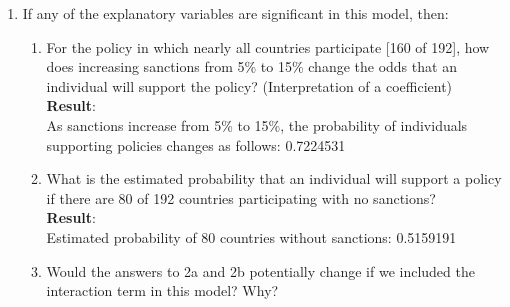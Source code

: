 \documentclass[12pt,letterpaper]{article}
\begin{document}
\begin{enumerate}
	\item
	If any of the explanatory variables are significant in this model, then:
	\begin{enumerate}
		\item
		For the policy in which nearly all countries participate [160 of 192], how does increasing sanctions from 5\% to 15\% change the odds that an individual will support the policy? (Interpretation of a coefficient)\\
		 
		\textbf{Result}:\\
		As sanctions increase from 5\% to 15\%, the probability of individuals supporting policies changes as follows: 0.7224531 \\
		\item
		What is the estimated probability that an individual will support a policy if there are 80 of 192 countries participating with no sanctions? \\
		 
		\textbf{Result}:\\
		Estimated probability of 80 countries without sanctions: 0.5159191 \\
		\item
		Would the answers to 2a and 2b potentially change if we included the interaction term in this model? Why? \\
		

\end{enumerate}
\end{enumerate}
\end{document}
